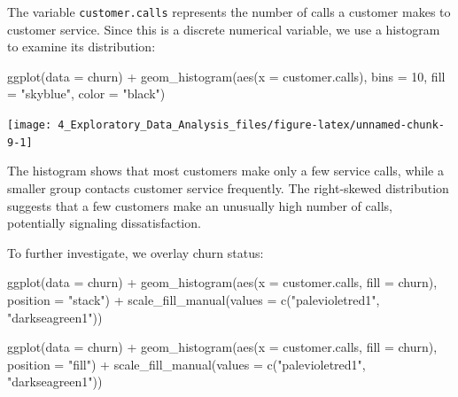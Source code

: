 \documentclass[
  11pt,
]{book}
\makeatletter
\newenvironment{Shaded}{}{}
\newcommand{\AttributeTok}[1]{#1}
\newcommand{\DecValTok}[1]{#1}
\newcommand{\FunctionTok}[1]{#1}
\newcommand{\NormalTok}[1]{#1}
\newcommand{\SpecialCharTok}[1]{\textcolor[rgb]{0.39,0.39,0.39}{#1}}
\newcommand{\StringTok}[1]{\textcolor[rgb]{0.39,0.39,0.39}{#1}}
\newenvironment{kframe}{%
\medskip{}
\setlength{\fboxsep}{.8em}
 \def\at@end@of@kframe{}%
 \ifinner\ifhmode%
  \def\at@end@of@kframe{\end{minipage}}%
  \begin{minipage}{\columnwidth}%
 \fi\fi%
 \def\FrameCommand##1{\hskip\@totalleftmargin \hskip-\fboxsep
 \colorbox{shadecolor}{##1}\hskip-\fboxsep
     \hskip-\linewidth \hskip-\@totalleftmargin \hskip\columnwidth}%
 \MakeFramed {\advance\hsize-\width
   \@totalleftmargin\z@ \linewidth\hsize
   \@setminipage}}%
 {\par\unskip\endMakeFramed%
 \at@end@of@kframe}
\renewenvironment{Shaded}{\begin{kframe}}{\end{kframe}}
\theoremstyle{definition}
\theoremstyle{definition}
\theoremstyle{definition}
\theoremstyle{definition}
\theoremstyle{remark}
\makeatother
\begin{document}
The variable \texttt{customer.calls} represents the number of calls a customer makes to customer service. Since this is a discrete numerical variable, we use a histogram to examine its distribution:

\begin{Shaded}
\begin{Highlighting}[]
\FunctionTok{ggplot}\NormalTok{(}\AttributeTok{data =}\NormalTok{ churn) }\SpecialCharTok{+}
  \FunctionTok{geom\_histogram}\NormalTok{(}\FunctionTok{aes}\NormalTok{(}\AttributeTok{x =}\NormalTok{ customer.calls), }
                 \AttributeTok{bins =} \DecValTok{10}\NormalTok{, }\AttributeTok{fill =} \StringTok{"skyblue"}\NormalTok{, }\AttributeTok{color =} \StringTok{"black"}\NormalTok{)}
\end{Highlighting}
\end{Shaded}

\begin{center}\texttt{[image: 4\_Exploratory\_Data\_Analysis\_files/figure-latex/unnamed-chunk-9-1]} \end{center}

The histogram shows that most customers make only a few service calls, while a smaller group contacts customer service frequently. The right-skewed distribution suggests that a few customers make an unusually high number of calls, potentially signaling dissatisfaction.

To further investigate, we overlay churn status:

\begin{Shaded}
\begin{Highlighting}[]
\FunctionTok{ggplot}\NormalTok{(}\AttributeTok{data =}\NormalTok{ churn) }\SpecialCharTok{+}
  \FunctionTok{geom\_histogram}\NormalTok{(}\FunctionTok{aes}\NormalTok{(}\AttributeTok{x =}\NormalTok{ customer.calls, }\AttributeTok{fill =}\NormalTok{ churn), }\AttributeTok{position =} \StringTok{"stack"}\NormalTok{) }\SpecialCharTok{+}
  \FunctionTok{scale\_fill\_manual}\NormalTok{(}\AttributeTok{values =} \FunctionTok{c}\NormalTok{(}\StringTok{"palevioletred1"}\NormalTok{, }\StringTok{"darkseagreen1"}\NormalTok{)) }
  
\FunctionTok{ggplot}\NormalTok{(}\AttributeTok{data =}\NormalTok{ churn) }\SpecialCharTok{+}
  \FunctionTok{geom\_histogram}\NormalTok{(}\FunctionTok{aes}\NormalTok{(}\AttributeTok{x =}\NormalTok{ customer.calls, }\AttributeTok{fill =}\NormalTok{ churn), }\AttributeTok{position =} \StringTok{"fill"}\NormalTok{) }\SpecialCharTok{+}
  \FunctionTok{scale\_fill\_manual}\NormalTok{(}\AttributeTok{values =} \FunctionTok{c}\NormalTok{(}\StringTok{"palevioletred1"}\NormalTok{, }\StringTok{"darkseagreen1"}\NormalTok{)) }
\end{Highlighting}
\end{Shaded}
\end{document}
